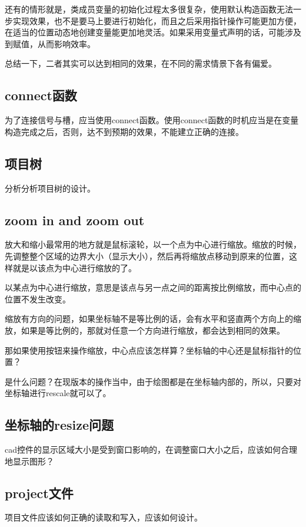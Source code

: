 还有的情形就是，类成员变量的初始化过程太多很复杂，使用默认构造函数无法一步实现效果，也不是要马上要进行初始化，而且之后采用指针操作可能更加方便，在适当的位置动态地创建变量能更加地灵活。如果采用变量式声明的话，可能涉及到赋值，从而影响效率。

总结一下，二者其实可以达到相同的效果，在不同的需求情景下各有偏爱。
\subsection{connect函数}
为了连接信号与槽，应当使用connect函数。使用connect函数的时机应当是在变量构造完成之后，否则，达不到预期的效果，不能建立正确的连接。
\subsection{项目树}
分析分析项目树的设计。

\subsection{zoom in and zoom out}
放大和缩小最常用的地方就是鼠标滚轮，以一个点为中心进行缩放。缩放的时候，先调整整个区域的边界大小（显示大小），然后再将缩放点移动到原来的位置，这样就是以该点为中心进行缩放的了。

以某点为中心进行缩放，意思是该点与另一点之间的距离按比例缩放，而中心点的位置不发生改变。

缩放有方向的问题，如果坐标轴不是等比例的话，会有水平和竖直两个方向上的缩放，如果是等比例的，那就对任意一个方向进行缩放，都会达到相同的效果。

那如果使用按钮来操作缩放，中心点应该怎样算？坐标轴的中心还是鼠标指针的位置？

是什么问题？在现版本的操作当中，由于绘图都是在坐标轴内部的，所以，只要对坐标轴进行rescale就可以了。
\subsection{坐标轴的resize问题}
cad控件的显示区域大小是受到窗口影响的，在调整窗口大小之后，应该如何合理地显示图形？
\subsection{project文件}
项目文件应该如何正确的读取和写入，应该如何设计。
